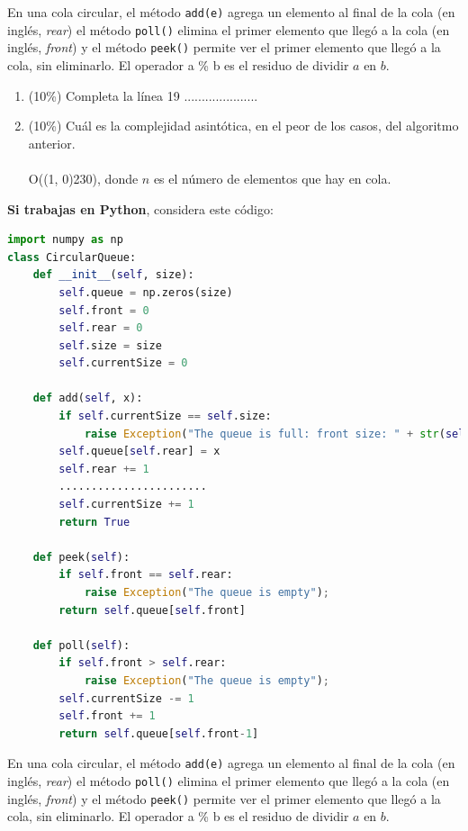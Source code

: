 \documentclass[10 pt]{article}
\begin{document}
En una cola circular, el método \texttt{add(e)} agrega un elemento al final de la cola (en inglés, \textit{rear})
el método \texttt{poll()} elimina el primer elemento que llegó a la cola (en inglés, \textit{front}) y el método
\texttt{peek()} permite ver el primer elemento que llegó a la cola, sin eliminarlo. El operador a \% b es el residuo de dividir $a$ en $b$.

\begin{enumerate}[label=(\Alph*)]
  \item (10\%) Completa la línea 19  .....................
  \item (10\%) Cuál es la complejidad asintótica, en el peor de los casos, del algoritmo anterior. \\ \\
  O(\line(1, 0){230}), donde $n$ es el número de elementos que hay en cola.
\end{enumerate}




\newpage


\textbf{Si trabajas en Python}, considera este código:


\begin{lstlisting}[language = python]
import numpy as np
class CircularQueue:
    def __init__(self, size): 
        self.queue = np.zeros(size)
        self.front = 0
        self.rear = 0
        self.size = size
        self.currentSize = 0
    
    def add(self, x):
        if self.currentSize == self.size: 
            raise Exception("The queue is full: front size: " + str(self.rear)) 
        self.queue[self.rear] = x
        self.rear += 1
        .......................
        self.currentSize += 1
        return True
    
    def peek(self):
        if self.front == self.rear: 
            raise Exception("The queue is empty");
        return self.queue[self.front]
    
    def poll(self):
        if self.front > self.rear: 
            raise Exception("The queue is empty");
        self.currentSize -= 1
        self.front += 1
        return self.queue[self.front-1]
\end{lstlisting}

En una cola circular, el método \texttt{add(e)} agrega un elemento al final de la cola (en inglés, \textit{rear})
el método \texttt{poll()} elimina el primer elemento que llegó a la cola (en inglés, \textit{front}) y el método
\texttt{peek()} permite ver el primer elemento que llegó a la cola, sin eliminarlo. El operador a \% b es el residuo de dividir $a$ en $b$.
\end{document}
